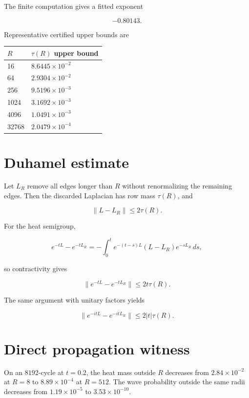 \documentclass[11pt,a4paper,openany]{report}
\begin{document}
The finite computation gives a fitted exponent

\[
-0.80143.
\]

Representative certified upper bounds are

\begin{center}
\begingroup\small
\setlength{\tabcolsep}{3.5pt}
\renewcommand{\arraystretch}{1.16}
\begin{longtable}{@{}p{}p{}@{}}
\toprule
\textbf{\(R\)} & \textbf{\(\tau(R)\) upper bound} \\
\midrule
\endhead
16 & \(8.6445\times10^{-2}\) \\
64 & \(2.9304\times10^{-2}\) \\
256 & \(9.5196\times10^{-3}\) \\
1024 & \(3.1692\times10^{-3}\) \\
4096 & \(1.0491\times10^{-3}\) \\
32768 & \(2.0479\times10^{-4}\) \\
\bottomrule
\end{longtable}
\endgroup
\end{center}

\section{Duhamel estimate}

Let \(L_R\) remove all edges longer than \(R\) without renormalizing the remaining edges. Then the discarded Laplacian has row mass \(\tau(R)\), and

\[
\|L-L_R\|\le2\tau(R).
\]

For the heat semigroup,

\[
e^{-tL}-e^{-tL_R}
=
-\int_0^t
e^{-(t-s)L}(L-L_R)e^{-sL_R}\,ds,
\]

so contractivity gives

\[
\|e^{-tL}-e^{-tL_R}\|
\le
2t\tau(R).
\]

The same argument with unitary factors yields

\[
\|e^{-itL}-e^{-itL_R}\|
\le
2|t|\tau(R).
\]

\section{Direct propagation witness}

On an \(8192\)-cycle at \(t=0.2\), the heat mass outside \(R\) decreases from \(2.84\times10^{-2}\) at \(R=8\) to \(8.89\times10^{-4}\) at \(R=512\). The wave probability outside the same radii decreases from \(1.19\times10^{-5}\) to \(3.53\times10^{-10}\).
\end{document}

